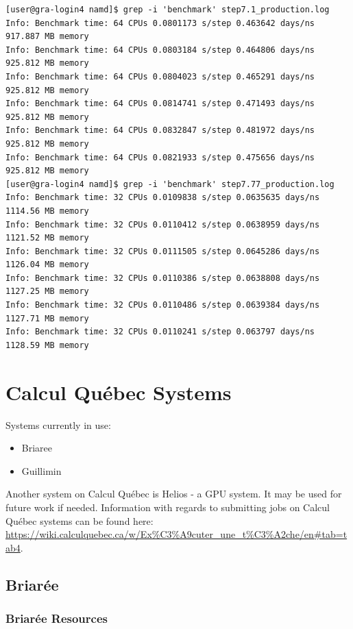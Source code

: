 \documentclass[12pt]{article}
\begin{document}
\begin{lstlisting}[numbers=none, basicstyle=\scriptsize]
[user@gra-login4 namd]$ grep -i 'benchmark' step7.1_production.log 
Info: Benchmark time: 64 CPUs 0.0801173 s/step 0.463642 days/ns 917.887 MB memory
Info: Benchmark time: 64 CPUs 0.0803184 s/step 0.464806 days/ns 925.812 MB memory
Info: Benchmark time: 64 CPUs 0.0804023 s/step 0.465291 days/ns 925.812 MB memory
Info: Benchmark time: 64 CPUs 0.0814741 s/step 0.471493 days/ns 925.812 MB memory
Info: Benchmark time: 64 CPUs 0.0832847 s/step 0.481972 days/ns 925.812 MB memory
Info: Benchmark time: 64 CPUs 0.0821933 s/step 0.475656 days/ns 925.812 MB memory
[user@gra-login4 namd]$ grep -i 'benchmark' step7.77_production.log
Info: Benchmark time: 32 CPUs 0.0109838 s/step 0.0635635 days/ns 1114.56 MB memory
Info: Benchmark time: 32 CPUs 0.0110412 s/step 0.0638959 days/ns 1121.52 MB memory
Info: Benchmark time: 32 CPUs 0.0111505 s/step 0.0645286 days/ns 1126.04 MB memory
Info: Benchmark time: 32 CPUs 0.0110386 s/step 0.0638808 days/ns 1127.25 MB memory
Info: Benchmark time: 32 CPUs 0.0110486 s/step 0.0639384 days/ns 1127.71 MB memory
Info: Benchmark time: 32 CPUs 0.0110241 s/step 0.063797 days/ns 1128.59 MB memory

\end{lstlisting} 

\newpage

\section{Calcul Qu\'{e}bec Systems}\label{CalcQ}

\quad Systems currently in use:
\begin{itemize}
\item Briaree
\item Guillimin
\end{itemize}
\quad\enskip\quad Another system on Calcul Qu\'{e}bec is Helios - a GPU system. It may be used for future work if needed. Information with regards to submitting jobs on Calcul Qu\'{e}bec systems can be found here: \url{https://wiki.calculquebec.ca/w/Ex%C3%A9cuter_une_t%C3%A2che/en#tab=tab4}. 


\subsection{Briar\'{e}e}

\subsubsection{Briar\'{e}e Resources}
\end{document}
